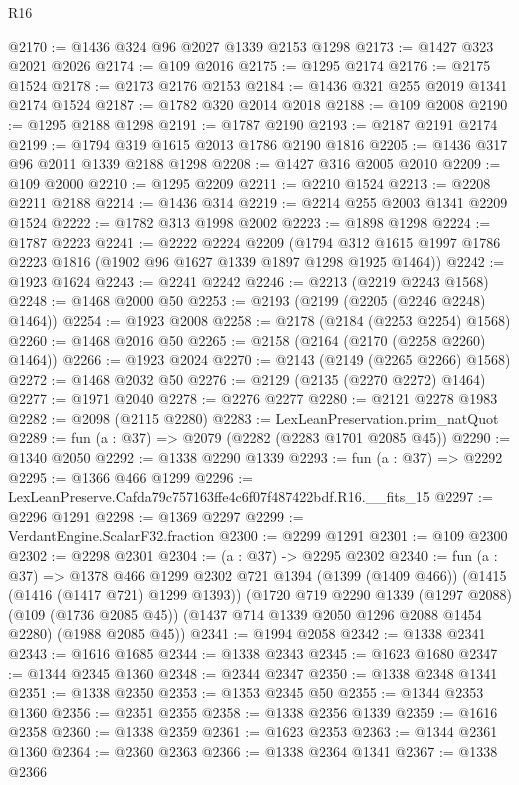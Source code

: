 \begin{lexlean}{R16}
\begin{coremodule}
@2170 := @1436 @324 @96 @2027 @1339 @2153 @1298
@2173 := @1427 @323 @2021 @2026
@2174 := @109 @2016
@2175 := @1295 @2174
@2176 := @2175 @1524
@2178 := @2173 @2176 @2153
@2184 := @1436 @321 @255 @2019 @1341 @2174 @1524
@2187 := @1782 @320 @2014 @2018
@2188 := @109 @2008
@2190 := @1295 @2188 @1298
@2191 := @1787 @2190
@2193 := @2187 @2191 @2174
@2199 := @1794 @319 @1615 @2013 @1786 @2190 @1816
@2205 := @1436 @317 @96 @2011 @1339 @2188 @1298
@2208 := @1427 @316 @2005 @2010
@2209 := @109 @2000
@2210 := @1295 @2209
@2211 := @2210 @1524
@2213 := @2208 @2211 @2188
@2214 := @1436 @314
@2219 := @2214 @255 @2003 @1341 @2209 @1524
@2222 := @1782 @313 @1998 @2002
@2223 := @1898 @1298
@2224 := @1787 @2223
@2241 := @2222
    @2224
    @2209
    (@1794 @312 @1615 @1997 @1786 @2223 @1816 (@1902 @96 @1627 @1339 @1897 @1298 @1925 @1464))
@2242 := @1923 @1624
@2243 := @2241 @2242
@2246 := @2213 (@2219 @2243 @1568)
@2248 := @1468 @2000 @50
@2253 := @2193 (@2199 (@2205 (@2246 @2248) @1464))
@2254 := @1923 @2008
@2258 := @2178 (@2184 (@2253 @2254) @1568)
@2260 := @1468 @2016 @50
@2265 := @2158 (@2164 (@2170 (@2258 @2260) @1464))
@2266 := @1923 @2024
@2270 := @2143 (@2149 (@2265 @2266) @1568)
@2272 := @1468 @2032 @50
@2276 := @2129 (@2135 (@2270 @2272) @1464)
@2277 := @1971 @2040
@2278 := @2276 @2277
@2280 := @2121 @2278 @1983
@2282 := @2098 (@2115 @2280)
@2283 := LexLeanPreservation.prim_natQuot
@2289 := fun (a : @37) => @2079 (@2282 (@2283 @1701 @2085 @45))
@2290 := @1340 @2050
@2292 := @1338 @2290 @1339
@2293 := fun (a : @37) => @2292
@2295 := @1366 @466 @1299
@2296 := LexLeanPreserve.Cafda79c757163ffe4c6f07f487422bdf.R16.__fits_15
@2297 := @2296 @1291
@2298 := @1369 @2297
@2299 := VerdantEngine.ScalarF32.fraction
@2300 := @2299 @1291
@2301 := @109 @2300
@2302 := @2298 @2301
@2304 := (a : @37) -> @2295 @2302
@2340 := fun (a : @37) =>
  @1378
    @466
    @1299
    @2302
    @721
    @1394
    (@1399 (@1409 @466))
    (@1415 (@1416 (@1417 @721) @1299 @1393))
    (@1720
      @719
      @2290
      @1339
      (@1297 @2088)
      (@109 (@1736 @2085 @45))
      (@1437 @714 @1339 @2050 @1296 @2088 @1454 @2280)
      (@1988 @2085 @45))
@2341 := @1994 @2058
@2342 := @1338 @2341
@2343 := @1616 @1685
@2344 := @1338 @2343
@2345 := @1623 @1680
@2347 := @1344 @2345 @1360
@2348 := @2344 @2347
@2350 := @1338 @2348 @1341
@2351 := @1338 @2350
@2353 := @1353 @2345 @50
@2355 := @1344 @2353 @1360
@2356 := @2351 @2355
@2358 := @1338 @2356 @1339
@2359 := @1616 @2358
@2360 := @1338 @2359
@2361 := @1623 @2353
@2363 := @1344 @2361 @1360
@2364 := @2360 @2363
@2366 := @1338 @2364 @1341
@2367 := @1338 @2366

\end{coremodule}
\end{lexlean}
